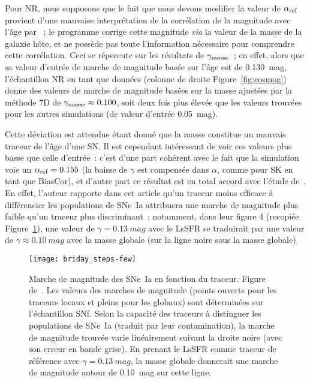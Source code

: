 \documentclass[../main/main.tex]{subfiles}
\begin{document}
Pour NR, nous supposons que le fait que nous devons modifier la valeur de
$\alpha_{\rm ref}$ provient d'une mauvaise interprétation de la corrélation de
la magnitude avec l'âge par \snana~; le programme corrige cette magnitude
\textit{via} la valeur de la masse de la galaxie hôte, et ne possède pas toute
l'information nécessaire pour comprendre cette corrélation. Ceci se répercute
sur les résultats de $\gamma_{\rm masse}$~; en effet, alors que sa valeur
d'entrée de marche de magnitude basée sur l'âge est de \SI{0.130}{mag},
l'échantillon NR en tant que données (colonne de droite Figure~\ref{fig:cosmog})
donne des valeurs de marche de magnitude basées sur la masse ajustées par la
méthode \bbc7D de $\gamma_{\rm masse} \approx \num{.100}$, soit deux fois plus
élevée que les valeurs trouvées pour les autres simulations (de valeur d'entrée
\SI{0.05}{mag}).

Cette déviation est attendue étant donné que la masse constitue un mauvais
traceur de l'âge d'une SN. Il est cependant intéressant de voir ces valeurs plus
basse que celle d'entrée~: c'est d'une part cohérent avec le fait que la
simulation voie un $\alpha_{\rm ref} = \num{0.155}$ (la baisse de $\gamma$ est
compensée dans $\alpha$, comme pour SK en tant que BiasCor), et d'autre part ce
résultat est en total accord avec l'étude de~\cite{briday2022}. En effet,
l'auteur rapporte dans cet article qu'un traceur moins efficace à différencier
les populations de SNe~Ia attribuera une marche de magnitude plus faible qu'un
traceur plus discriminant~; notamment, dans leur figure 4 (recopiée
Figure~\ref{fig:briday_steps}), une valeur de $\gamma =
\SI{0.13}{mag}$ avec le LsSFR se traduirait par une valeur de $\gamma \approx
\SI{0.10}{mag}$ avec la masse globale (sur la ligne noire sous la masse
globale).


\begin{figure}[]
    \centering
    \texttt{[image: briday\_steps-few]}
    \caption[Marche de magnitude des SNe~Ia en fonction du traceur]{Marche de
        magnitude des SNe~Ia en fonction du traceur. Figure
        de~\cite{briday2021}. Les valeurs des marches de magnitude (points
        ouverts pour les traceurs locaux et pleins pour les globaux) sont
        déterminées sur l'échantillon SNf. Selon la capacité des traceurs à
        distinguer les populations de SNe~Ia (traduit par leur contamination),
        la marche de magnitude trouvée varie linéairement suivant la droite
        noire (avec son erreur en bande grise). En prenant le LsSFR comme
        traceur de référence avec $\gamma = \SI{0.13}{mag}$, la masse globale
        donnerait une marche de magnitude autour de \SI{0.10}{mag} sur cette
    ligne.}\label{fig:briday_steps}
\end{figure}
\end{document}

